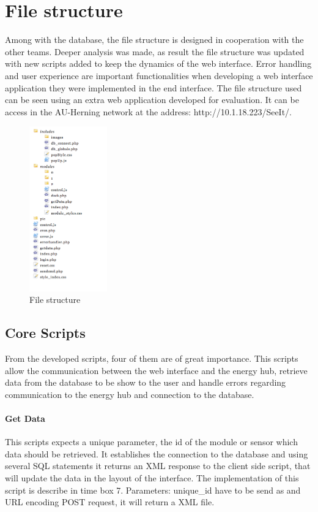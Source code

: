 \section{File structure}
Among with the database, the file structure is designed in cooperation with the other teams. Deeper analysis was made, as result the file structure was updated with new scripts added to keep the dynamics of the web interface. Error handling and user experience are important functionalities when developing a web interface application they were implemented in the end interface.
\p
The file structure used can be seen using an extra web application developed for evaluation. It can be access in the AU-Herning network at the address: http://10.1.18.223/SeeIt/.
\begin{figure}[H]
	\begin{centering}
		\includegraphics[width=0.3\textwidth]{images/file_structure.png}
		\caption{File structure}
	\end{centering}
\end{figure}
%
\subsection{Core Scripts}
From the developed scripts, four of them are of great importance. This scripts allow the communication between the web interface and the energy hub, retrieve data from the database to be show to the user and handle errors regarding communication to the energy hub and connection to the database.

\paragraph{Get Data}
This scripts expects a unique parameter, the id of the module or sensor which data should be retrieved. It establishes the connection to the database and using several SQL statements it returns an XML response to the client side script, that will update the data in the layout of the interface. The implementation of this script is describe in time box 7.
\p
Parameters: unique\_id have to be send as and URL encoding POST request, it will return a XML file.
